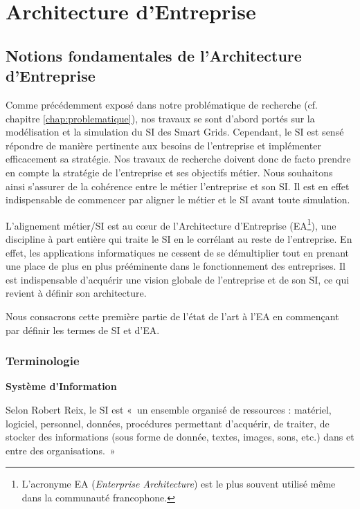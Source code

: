 \chapter{Architecture d'Entreprise}
\label{chap:EA}





\section{Notions fondamentales de l'Architecture d'Entreprise}

Comme précédemment exposé dans notre problématique de recherche (cf. chapitre \ref{chap:problematique}), nos travaux se sont d'abord portés sur la modélisation et la simulation du SI des Smart Grids. Cependant, le SI est sensé répondre de manière pertinente aux besoins de l'entreprise et implémenter efficacement sa stratégie. Nos travaux de recherche doivent donc de facto prendre en compte la stratégie de l'entreprise et ses objectifs métier. Nous souhaitons ainsi s'assurer de la cohérence entre le métier l'entreprise et son SI. Il est en effet indispensable de commencer par aligner le métier et le SI avant toute simulation. 

L'alignement métier/SI est au cœur de l'Architecture d'Entreprise (EA\footnote{L'acronyme EA (\textit{Enterprise Architecture}) est le plus souvent utilisé même dans la communauté francophone.}), une discipline à part entière qui traite le SI en le corrélant au reste de l'entreprise. En effet, les applications informatiques ne cessent de se démultiplier tout en prenant une place de plus en plus prééminente dans le fonctionnement des entreprises. Il est indispensable d'acquérir une vision globale de l'entreprise et de son SI, ce qui revient à définir son architecture.  

Nous consacrons cette première partie de l'état de l'art à l'EA en commençant par définir les termes de SI et d'EA. 
  
	\subsection{Terminologie}
	
\textbf{Système d'Information}


Selon Robert Reix, le SI est «~un ensemble organisé de ressources : matériel, 
logiciel, personnel, données, procédures permettant d'acquérir, de traiter, de 
stocker des informations (sous forme de donnée, textes, images, sons, etc.) dans 
et entre des organisations.~»

